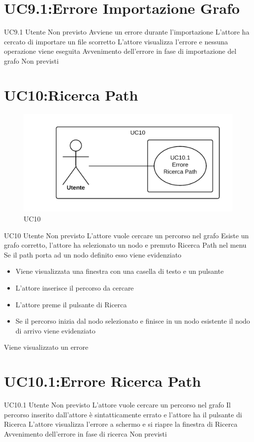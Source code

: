 \documentclass[../AnalisideiRequisiti.tex]{subfiles}
\begin{document}
\section{UC9.1:Errore Importazione Grafo}
\UserCase
{UC9.1}
{Utente}
{Non previsto}
{Avviene un errore durante l'importazione}
{L'attore ha cercato di importare un file scorretto}
{L'attore visualizza l'errore e nessuna operazione viene eseguita}
{Avvenimento dell'errore in fase di importazione del grafo}
{Non previsti}

\section{UC10:Ricerca Path}
\begin{figure}[H]
	\caption{UC10}
	\centering
	\includegraphics[width=\textwidth]{../img/UC10.png}
\end{figure}
\UserCase
{UC10}
{Utente}
{Non previsto}
{L'attore vuole cercare un percorso nel grafo}
{Esiste un grafo corretto, l'attore ha selezionato un nodo e premuto Ricerca Path nel menu}
{Se il path porta ad un nodo definito esso viene evidenziato }
{
	\begin{itemize}
		\item{} Viene visualizzata una finestra con una casella di testo e un pulsante
		\item{} L'attore inserisce il percorso da cercare
		\item{} L'attore preme il pulsante di Ricerca
		\item{} Se il percorso inizia dal nodo selezionato e finisce in un nodo esistente il nodo di arrivo viene evidenziato 
 	\end{itemize}
}
{Viene visualizzato un errore }

\section{UC10.1:Errore Ricerca Path}
\UserCase
{UC10.1}
{Utente}
{Non previsto}
{L'attore vuole cercare un percorso nel grafo}
{Il percorso inserito dall'attore è sintatticamente errato e l'attore ha il pulsante di Ricerca}
{L'attore visualizza l'errore a schermo e si riapre la finestra di Ricerca }
{Avvenimento dell'errore in fase di ricerca}
{Non previsti}
\end{document}
